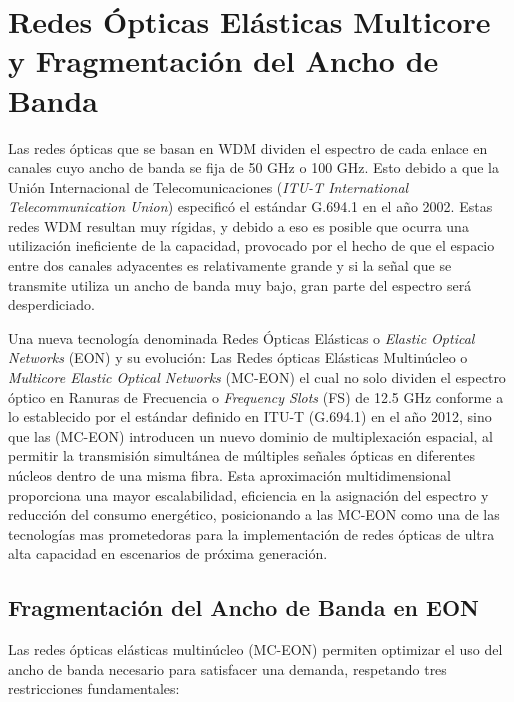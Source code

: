 \chapter{Redes Ópticas Elásticas Multicore y Fragmentación del Ancho de Banda}
Las redes ópticas que se basan en WDM dividen el espectro de cada enlace en canales cuyo ancho de banda se fija de 50 GHz o 100 GHz. Esto debido a que la Unión Internacional de Telecomunicaciones (\textit{ITU-T International Telecommunication Union}) especificó el estándar G.694.1 en el año 2002.
%
Estas redes WDM resultan muy rígidas, y debido a eso es posible que ocurra una utilización ineficiente de la capacidad, provocado por el hecho de que el espacio entre dos canales adyacentes es relativamente grande y si la señal que se transmite utiliza un ancho de banda muy bajo, gran parte del espectro será desperdiciado.
%

Una nueva tecnología denominada Redes Ópticas Elásticas o \textit{Elastic Optical Networks} (EON) y su evolución: Las Redes ópticas Elásticas Multinúcleo o \textit{Multicore Elastic Optical Networks} (MC-EON) el cual no solo dividen el espectro óptico en Ranuras de Frecuencia o \textit{Frequency Slots} (FS) de 12.5 GHz conforme a lo establecido por el estándar definido en ITU-T (G.694.1) en el año 2012, sino que las (MC-EON) introducen un nuevo dominio de multiplexación espacial, al permitir la transmisión simultánea de múltiples señales ópticas en diferentes núcleos dentro de una misma fibra.
%
Esta aproximación multidimensional proporciona una mayor escalabilidad, eficiencia en la asignación del espectro y reducción del consumo energético, posicionando a las MC-EON como una de las tecnologías mas prometedoras para la implementación de redes ópticas de ultra alta capacidad en escenarios de próxima generación.
%




\section{Fragmentación del Ancho de Banda en EON}
Las redes ópticas elásticas multinúcleo (MC-EON) permiten optimizar el uso del ancho de banda necesario para satisfacer una demanda, respetando tres restricciones fundamentales:
%

